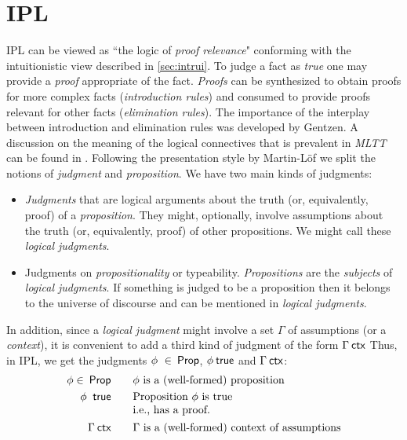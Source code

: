 \section{IPL}
\ac{IPL} can be viewed as ``the logic of \emph{proof relevance}" conforming with the intuitionistic view described in \ref{sec:intrui}. To judge a fact as \emph{true} one may provide a \emph{proof}
appropriate of the fact. \emph{Proofs} can be synthesized to obtain 
proofs for more complex facts (\emph{introduction rules}) and consumed
 to provide proofs relevant for other  facts (\emph{elimination rules}). The importance of the interplay between introduction and elimination rules was developed by Gentzen. 
 A discussion on the meaning of the logical connectives that is prevalent in \emph{MLTT} can be found
in \cite{martin1996meanings}. 
Following the presentation style  by   Martin-L\"{o}f we split the notions of \emph{judgment} and \emph{proposition}. We have two main kinds of judgments:
\begin{itemize}
\item  \emph{Judgments} that are logical arguments about the truth (or, equivalently, proof) of a \emph{proposition}. They might, optionally, involve 
assumptions about the truth (or, equivalently, proof) of other propositions. We might call these \emph{logical judgments}. 

\item Judgments on \emph{propositionality} or typeability. \emph{Propositions} are the \emph{subjects}  of \emph{logical judgments}. If something is judged to be a proposition then it belongs to the universe of discourse and can be mentioned in \emph{logical judgments}. 
\end{itemize} 
In addition, since a \emph{logical judgment} might involve a set $\Gamma$ of assumptions (or a \emph{context}), it is convenient to add a third kind of judgment of the form $\Gamma \context$ 
Thus, in \ac{IPL}, we get the judgments $\phi\ \in \prop$, $\phi \true$ and $\Gamma \context$:
\begin{alignat*}{2}
  \phi \in \prop &&\quad& \text{$
  \phi$ is a (well-formed) proposition} \\
  \phi\  \true &&& \text{\begin{tabular}[t]{@{}l@{}}
                Proposition $\phi$ is true \\
                i.e., has a proof.
              \end{tabular}}\\
  \Gamma \context &&\quad& \text{$\Gamma$ is a (well-formed) context of assumptions} \\
\end{alignat*}

